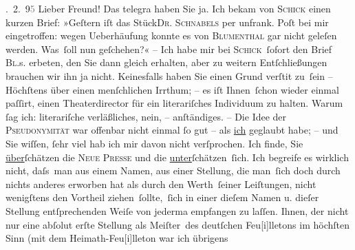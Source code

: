 . 2. 9\textcolor{gray}{5}\pend
           \vspace{0.5em}
\pstart
           Lieber Freund! Das telegra{\geminationm} haben Sie ja. Ich bekam von \textsc{Schick} einen kurzen Brief: »Geſtern iſt das Stück\textsc{Dr. Schnabels} per unfrank. Poſt bei mir eingetroffen: wegen
               Ueberhäufung konnte es von \textsc{Blumenthal} gar nicht geleſen werden. Was ſoll nun geſchehen?« – Ich habe mir bei \textsc{Schick} ſofort den Brief \textsc{Bl.}s. erbeten, den Sie dann gleich erhalten, aber zu weitern Entſchließungen
               brauchen wir ihn ja nicht. Keinesfalls haben Sie einen Grund verſti{\geminationm}t zu ſein –
               Höchſtens über einen menſchlichen Irrthum; – es iſt Ihnen ſchon wieder einmal
               paſſirt, einen Theaterdirector für ein literariſches Individuum zu halten. Warum{ }ſag
               ich: literariſche {\pb}verläßliches, nein, – anſtändiges. – Die
               Idee der \textsc{Pseudonymität} war offenbar nicht einmal{ }ſo gut –
               als \uline{ich} geglaubt habe; – und Sie wiſſen,{ }ſehr viel hab
               ich mir davon nicht verſprochen. Ich finde, Sie \uline{über}ſchätzen die \textsc{Neue Presse} und die \uline{unter}ſchätzen ſich. Ich begreife es
               wirklich nicht, daſs man aus einem Namen, aus einer Stellung, die man ſich doch durch
               nichts anderes erworben hat als durch den Werth ſeiner Leiſtungen, nicht wenigſtens
               den Vortheil ziehen ſollte, ſich in einer dieſem Namen u. dieſer Stellung
               entſprechenden Weiſe von jederma{\geminationn} empfangen {\pb}zu laſſen.
               Ihnen, der nicht nur eine abſolut erſte Stellung als Meiſter des deutſchen
               Feu{[}i{]}lletons im höchſten Sinn (mit dem Heimath-Feu{[}i{]}lleton war ich übrigens
